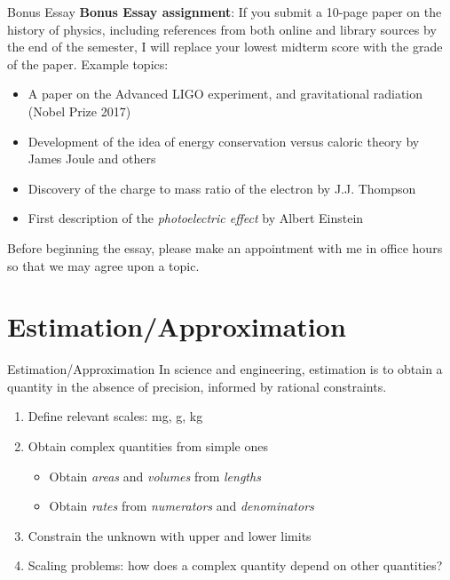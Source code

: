 \documentclass{beamer}
\begin{document}
\begin{frame}{Bonus Essay}
\small
\textbf{\alert{Bonus Essay assignment}}: If you submit a 10-page paper on the history of physics, including references from both online and library sources by the end of the semester, I will replace your lowest midterm score with the grade of the paper.  Example topics:
\begin{itemize}
\item A paper on the Advanced LIGO experiment, and gravitational radiation (Nobel Prize 2017)
\item Development of the idea of energy conservation versus caloric theory by James Joule and others
\item Discovery of the charge to mass ratio of the electron by J.J. Thompson
\item First description of the \textit{photoelectric effect} by Albert Einstein
\end{itemize}
Before beginning the essay, please make an appointment with me in office hours so that we may agree upon a topic.
\end{frame}

\section{Estimation/Approximation}

\begin{frame}{Estimation/Approximation}
In science and engineering, \alert{estimation} is to obtain a quantity in the absence of precision, informed by rational constraints.
\begin{enumerate}
\item Define relevant \alert{scales}: mg, g, kg
\item Obtain \alert{complex quantities} from simple ones
\begin{itemize}
\item Obtain \textit{areas} and \textit{volumes} from \textit{lengths}
\item Obtain \textit{rates} from \textit{numerators} and \textit{denominators}
\end{itemize}
\item Constrain the unknown with \alert{upper} and \alert{lower} limits
\item Scaling problems: how does a complex quantity depend on other quantities?
\end{enumerate}
\end{frame}
\end{document}
